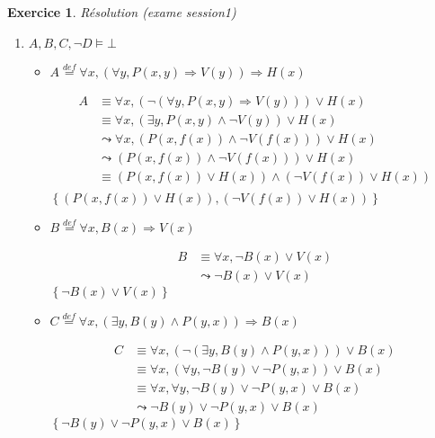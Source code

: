 \documentclass{article}
\theoremstyle{plain}
\newtheorem{exo}{Exercice}%
\begin{document}
\begin{exo} \textit{Résolution (exame session1)}
\begin{enumerate}
    \item $A, B, C, \neg D \models \bot$
      \begin{itemize}
        \item $A \overset{def}{=} \forall x, 
              (\forall y, P(x, y) \Rightarrow V(y)) \Rightarrow H(x)$

        \begin{align*}
            A &\equiv \forall x, (\neg (\forall y, P(x, y) \Rightarrow V(y))) \vee 
                                                                              H(x) \\
                & \equiv \forall x, (\exists y, P(x, y) \land \neg V(y)) \vee H(x) \\
                & \leadsto \forall x, (P(x, f(x)) \land \neg V(f(x))) \vee H(x) \\
                & \leadsto (P(x, f(x)) \land \neg V(f(x))) \vee H(x) \\
                & \equiv (P(x, f(x)) \vee H(x)) \land (\neg V(f(x)) \vee H(x)) \\
        \end{align*}
        $\left\{(P(x, f(x)) \vee H(x)), (\neg V(f(x)) \vee H(x))\right\}$ \vspace{5mm}

        \item $B \overset{def}{=} \forall x, B(x) \Rightarrow V(x)$

        \begin{align*}
            B &\equiv \forall x, \neg B(x) \vee V(x) \\
                &\leadsto \neg B(x) \vee V(x)
        \end{align*}
        $\left\{\neg B(x) \vee V(x)\right\}$\vspace{5mm}

        \item $C \overset{def}{=} \forall x, (\exists y, B(y) \land P(y, x)) \Rightarrow B(x)$

        \begin{align*}
            C &\equiv \forall x, (\neg (\exists y, B(y) \land P(y, x))) \vee B(x) \\
                &\equiv \forall x, (\forall y, \neg B(y) \vee \neg P(y, x)) \vee B(x) \\
                &\equiv \forall x, \forall y, \neg B(y) \vee \neg P(y, x) \vee B(x) \\
                &\leadsto \neg B(y) \vee \neg P(y, x) \vee B(x)
        \end{align*}
        $\left\{\neg B(y) \vee \neg P(y, x) \vee B(x)\right\}$\vspace{5mm}


\end{itemize}
\end{enumerate}
\end{exo}
\end{document}
